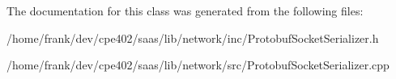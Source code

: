 The documentation for this class was generated from the following files\+:\begin{DoxyCompactItemize}
\item 
/home/frank/dev/cpe402/saas/lib/network/inc/Protobuf\+Socket\+Serializer.\+h\item 
/home/frank/dev/cpe402/saas/lib/network/src/Protobuf\+Socket\+Serializer.\+cpp\end{DoxyCompactItemize}
